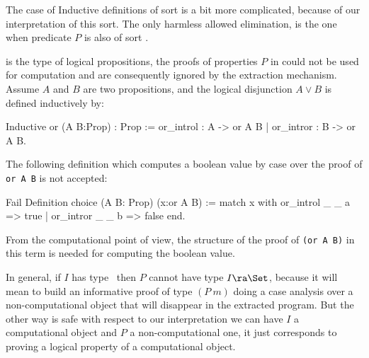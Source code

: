 The case of Inductive definitions of sort \Prop{} is a bit more
complicated, because of our interpretation of this sort. The only
harmless allowed elimination, is the one when predicate $P$ is also of
sort \Prop.
\begin{description}
\item[\Prop] 
\end{description}
\Prop{} is the type of logical propositions, the proofs of properties
$P$ in \Prop{} could not be used for computation and are consequently
ignored by the extraction mechanism.
Assume $A$ and $B$ are two propositions, and the logical disjunction
$A\vee B$ is defined inductively by:
\begin{coq_example*}
Inductive or (A B:Prop) : Prop :=
  or_introl : A -> or A B | or_intror : B -> or A B.
\end{coq_example*}
The following definition which computes a boolean value by case over
the proof of \texttt{or A B} is not accepted:
\begin{coq_example}
Fail Definition choice (A B: Prop) (x:or A B) :=
  match x with or_introl _ _ a => true | or_intror _ _ b => false end.
\end{coq_example}
From the computational point of view, the structure of the proof of
\texttt{(or A B)} in this term is needed for computing the boolean
value.

In general, if $I$ has type \Prop\ then $P$ cannot have type $I\ra
\Set$, because it will mean to build an informative proof of type
$(P~m)$ doing a case analysis over a non-computational object that
will disappear in the extracted program.  But the other way is safe
with respect to our interpretation we can have $I$ a computational
object and $P$ a non-computational one, it just corresponds to proving
a logical property of a computational object.


